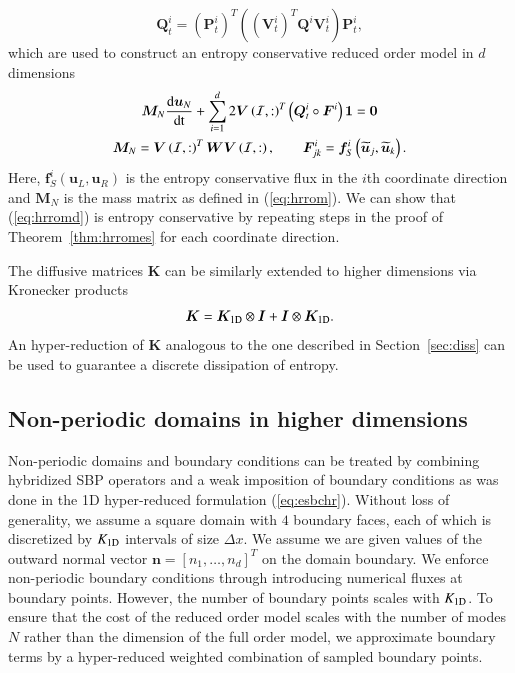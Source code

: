 \documentclass[preprint,10pt]{elsarticle}
\theoremstyle{definition}
\theoremstyle{lemma}
\theoremstyle{theorem}
\theoremstyle{assumption}
\renewcommand{\tilde}{\widetilde}
\newcommand{\td}[2]{\frac{{\rm d}#1}{{\rm d}{\rm #2}}}
\newcommand{\LRp}[1]{\left( #1 \right)}
\newcommand{\LRs}[1]{\left[ #1 \right]}
\begin{document}
\[
\bm{Q}_t^i = \LRp{\bm{P}^i_t}^T\LRp{\LRp{\bm{V}^i_t}^T\bm{Q}^i\bm{V}^i_t}\bm{P}^i_t,
\]
which are used to construct an entropy conservative reduced order model in $d$ dimensions
\begin{gather}
\bm{M}_N\td{\bm{u}_N}{t} + \sum_{i=1}^d 2\bm{V}\LRp{\mathcal{I},:}^T\LRp{\bm{Q}^i_t \circ \bm{F}^i}\bm{1} = \bm{0} \label{eq:hrromd}\\
\bm{M}_N = \bm{V}\LRp{\mathcal{I},:}^T\bm{W}\bm{V}\LRp{\mathcal{I},:}, \qquad \bm{F}^i_{jk} = \bm{f}^i_S\LRp{\tilde{\bm{u}}_j,\tilde{\bm{u}}_k}.\nonumber
\end{gather}
Here, $\bm{f}^i_S\LRp{\bm{u}_L,\bm{u}_R}$ is the entropy conservative flux in the $i$th coordinate direction and $\bm{M}_N$ is the mass matrix as defined in (\ref{eq:hrrom}).  We can show that (\ref{eq:hrromd}) is entropy conservative by repeating steps in the proof of Theorem~\ref{thm:hrromes} for each coordinate direction.  

The diffusive matrices $\bm{K}$ can be similarly extended to higher dimensions via Kronecker products
\[
\bm{K} = \bm{K}_{\rm 1D}\otimes \bm{I} + \bm{I}\otimes \bm{K}_{\rm 1D}.  
\]
An hyper-reduction of $\bm{K}$ analogous to the one described in Section~\ref{sec:diss} can be used to guarantee a discrete dissipation of entropy.  

\subsection{Non-periodic domains in higher dimensions}

Non-periodic domains and boundary conditions can be treated by combining hybridized SBP operators and a weak imposition of boundary conditions as was done in the 1D hyper-reduced formulation (\ref{eq:esbchr}).  Without loss of generality, we assume a square domain with $4$ boundary faces, each of which is discretized by $K_{\rm 1D}$ intervals of size $\Delta x$.  We assume we are given values of the outward normal vector $\bm{n} = \LRs{n_1, \ldots, n_d}^T$ on the domain boundary.  We enforce non-periodic boundary conditions through introducing numerical fluxes at boundary points.  However, the number of boundary points scales with $K_{\rm 1D}$.  To ensure that the cost of the reduced order model scales with the number of modes $N$ rather than the dimension of the full order model, we approximate boundary terms by a hyper-reduced weighted combination of sampled boundary points.  
\end{document}
